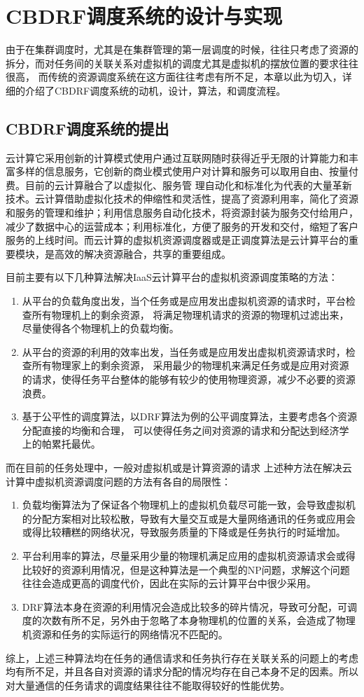 \chapter{CBDRF调度系统的设计与实现}
\label{cha:frontmatter}
由于在集群调度时，尤其是在集群管理的第一层调度的时候，往往只考虑了资源的拆分，而对任务间的关联关系对虚拟机的调度尤其是虚拟机的摆放位置的要求往往很高，
而传统的资源调度系统在这方面往往考虑有所不足，本章以此为切入，详细的介绍了CBDRF调度系统的动机，设计，算法，和调度流程。

\section{CBDRF调度系统的提出}
云计算它采用创新的计算模式使用户通过互联网随时获得近乎无限的计算能力和丰富多样的信息服务，它创新的商业模式使用户对计算和服务可以取用自由、按量付费。目前的云计算融合了以虚拟化、服务管 理自动化和标准化为代表的大量革新技术。云计算借助虚拟化技术的伸缩性和灵活性，提高了资源利用率，简化了资源和服务的管理和维护；利用信息服务自动化技术，将资源封装为服务交付给用户，减少了数据中心的运营成本；利用标准化，方便了服务的开发和交付，缩短了客户服务的上线时间。而云计算的虚拟机资源调度器或是正调度算法是云计算平台的重要模块，是高效的解决资源融合，共享的重要组成。

目前主要有以下几种算法解决IaaS云计算平台的虚拟机资源调度策略的方法：
 \begin{enumerate}
\item 从平台的负载角度出发，当个任务或是应用发出虚拟机资源的请求时，平台检查所有物理机上的剩余资源，
将满足物理机请求的资源的物理机过滤出来，尽量使得各个物理机上的负载均衡。
\item 从平台的资源的利用的效率出发，当任务或是应用发出虚拟机资源请求时，检查所有物理家上的剩余资源，
采用最少的物理机来满足任务或是应用对资源的请求，使得任务平台整体的能够有较少的使用物理资源，减少不必要的资源浪费。
\item 基于公平性的调度算法，以DRF算法为例的公平调度算法，主要考虑各个资源分配直接的均衡和合理，
可以使得任务之间对资源的请求和分配达到经济学上的帕累托最优。
\end{enumerate}

而在目前的任务处理中，一般对虚拟机或是计算资源的请求
上述种方法在解决云计算中虚拟机资源调度问题的方法有各自的局限性：
\begin{enumerate}
\item 负载均衡算法为了保证各个物理机上的虚拟机负载尽可能一致，会导致虚拟机的分配方案相对比较松散，导致有大量交互或是大量网络通讯的任务或应用会或得比较糟糕的网络状况，导致服务质量的下降或是任务执行的时延增加。
\item 平台利用率的算法，尽量采用少量的物理机满足应用的虚拟机资源请求会或得比较好的资源利用情况，但是这种算法是一个典型的NP问题，求解这个问题往往会造成更高的调度代价，因此在实际的云计算平台中很少采用。
\item DRF算法本身在资源的利用情况会造成比较多的碎片情况，导致可分配，可调度的次数有所不足，另外由于忽略了本身物理机的位置的关系，会造成了物理机资源和任务的实际运行的网络情况不匹配的。
\end{enumerate}
综上，上述三种算法均在任务的通信请求和任务执行存在关联关系的问题上的考虑均有所不足，并且各自对资源的请求分配的情况均存在自己本身不足的因素。所以对大量通信的任务请求的调度结果往往不能取得较好的性能优势。

